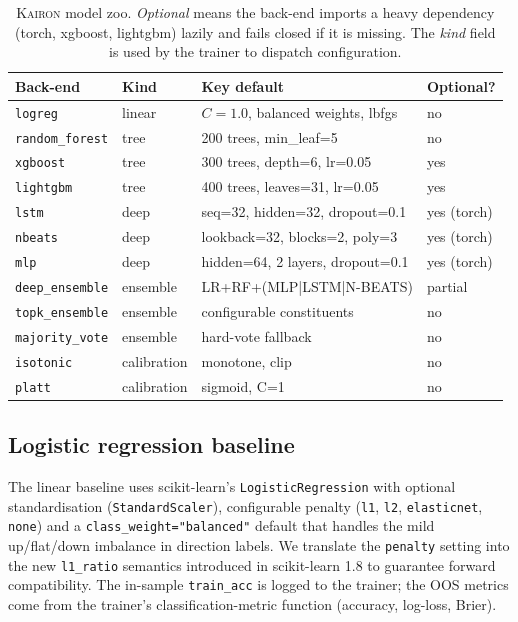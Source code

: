 \documentclass[11pt,a4paper]{article}
\providecommand{\kairon}{\textsc{Kairon}}
\begin{document}
\begin{table}[htbp]
\centering
\small
\caption{\kairon{} model zoo. \emph{Optional} means the back-end
imports a heavy dependency (torch, xgboost, lightgbm) lazily and
fails closed if it is missing. The \emph{kind} field is used by
the trainer to dispatch configuration.}
\label{tab:models}
\begin{tabularx}{\linewidth}{@{}llXl@{}}
\toprule
\textbf{Back-end}     & \textbf{Kind}    & \textbf{Key default}            & \textbf{Optional?}\\
\midrule
\texttt{logreg}           & linear     & $C{=}1.0$, balanced weights, lbfgs  & no\\
\texttt{random\_forest}   & tree       & 200 trees, min\_leaf=5              & no\\
\texttt{xgboost}          & tree       & 300 trees, depth=6, lr=0.05         & yes\\
\texttt{lightgbm}         & tree       & 400 trees, leaves=31, lr=0.05       & yes\\
\texttt{lstm}             & deep       & seq=32, hidden=32, dropout=0.1      & yes (torch)\\
\texttt{nbeats}           & deep       & lookback=32, blocks=2, poly=3       & yes (torch)\\
\texttt{mlp}              & deep       & hidden=64, 2 layers, dropout=0.1    & yes (torch)\\
\texttt{deep\_ensemble}   & ensemble   & LR+RF+(MLP|LSTM|N-BEATS)            & partial\\
\texttt{topk\_ensemble}   & ensemble   & configurable constituents            & no\\
\texttt{majority\_vote}   & ensemble   & hard-vote fallback                   & no\\
\texttt{isotonic}         & calibration& monotone, clip                       & no\\
\texttt{platt}            & calibration& sigmoid, C=1                        & no\\
\bottomrule
\end{tabularx}
\end{table}

\subsection{Logistic regression baseline}

The linear baseline uses scikit-learn's
\texttt{LogisticRegression} with optional standardisation
(\texttt{StandardScaler}), configurable penalty (\texttt{l1},
\texttt{l2}, \texttt{elasticnet}, \texttt{none}) and a
\texttt{class\_weight="balanced"} default that handles the
mild up/flat/down imbalance in direction labels. We translate
the \texttt{penalty} setting into the new
\texttt{l1\_ratio} semantics introduced in scikit-learn 1.8 to
guarantee forward compatibility. The in-sample
\texttt{train\_acc} is logged to the trainer; the OOS
metrics come from the trainer's classification-metric function
(accuracy, log-loss, Brier).
\end{document}

